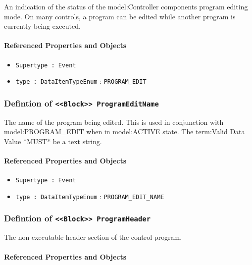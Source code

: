 An indication of the status of the {model:Controller} components program editing mode. 
 On many controls, a program can be edited while another program is currently being executed.

\FloatBarrier
\paragraph{Referenced Properties and Objects}

\begin{itemize}
\item \texttt{Supertype : Event}

\item \texttt{type : DataItemTypeEnum} : \texttt{PROGRAM_EDIT}

\end{itemize}
\FloatBarrier
\subsubsection{Defintion of \texttt{<<Block>> ProgramEditName}}
  \label{type:ProgramEditName}

\FloatBarrier

The name of the program being edited. 
 This is used in conjunction with {model:PROGRAM_EDIT} when in {model:ACTIVE} state. 
 The {term:Valid Data Value} *MUST* be a text string.

\FloatBarrier
\paragraph{Referenced Properties and Objects}

\begin{itemize}
\item \texttt{Supertype : Event}

\item \texttt{type : DataItemTypeEnum} : \texttt{PROGRAM_EDIT_NAME}

\end{itemize}
\FloatBarrier
\subsubsection{Defintion of \texttt{<<Block>> ProgramHeader}}
  \label{type:ProgramHeader}

\FloatBarrier

The non-executable header section of the control program.

\FloatBarrier
\paragraph{Referenced Properties and Objects}

